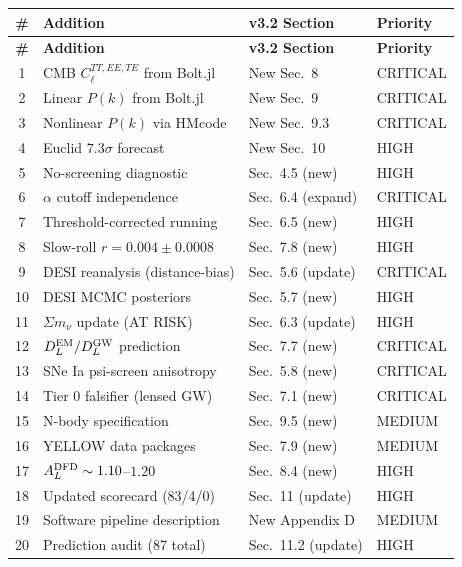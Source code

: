 \documentclass[11pt,a4paper]{article}
\begin{document}
\begin{center}
\begin{longtable}{clll}
\toprule
\textbf{\#} & \textbf{Addition} & \textbf{v3.2 Section} & \textbf{Priority} \\
\midrule
\endfirsthead
\toprule
\textbf{\#} & \textbf{Addition} & \textbf{v3.2 Section} & \textbf{Priority} \\
\midrule
\endhead
1 & CMB $C_\ell^{TT,EE,TE}$ from Bolt.jl & New Sec.\ 8 & CRITICAL \\
2 & Linear $P(k)$ from Bolt.jl & New Sec.\ 9 & CRITICAL \\
3 & Nonlinear $P(k)$ via HMcode & New Sec.\ 9.3 & CRITICAL \\
4 & Euclid $7.3\sigma$ forecast & New Sec.\ 10 & HIGH \\
5 & No-screening diagnostic & Sec.\ 4.5 (new) & HIGH \\
6 & $\alpha$ cutoff independence & Sec.\ 6.4 (expand) & CRITICAL \\
7 & Threshold-corrected running & Sec.\ 6.5 (new) & HIGH \\
8 & Slow-roll $r = 0.004 \pm 0.0008$ & Sec.\ 7.8 (new) & HIGH \\
9 & DESI reanalysis (distance-bias) & Sec.\ 5.6 (update) & CRITICAL \\
10 & DESI MCMC posteriors & Sec.\ 5.7 (new) & HIGH \\
11 & $\Sigma m_\nu$ update (AT RISK) & Sec.\ 6.3 (update) & HIGH \\
12 & $D_L^{\rm EM}/D_L^{\rm GW}$ prediction & Sec.\ 7.7 (new) & CRITICAL \\
13 & SNe Ia psi-screen anisotropy & Sec.\ 5.8 (new) & CRITICAL \\
14 & Tier 0 falsifier (lensed GW) & Sec.\ 7.1 (new) & CRITICAL \\
15 & N-body specification & Sec.\ 9.5 (new) & MEDIUM \\
16 & YELLOW data packages & Sec.\ 7.9 (new) & MEDIUM \\
17 & $A_L^{\rm DFD} \sim 1.10$--$1.20$ & Sec.\ 8.4 (new) & HIGH \\
18 & Updated scorecard (83/4/0) & Sec.\ 11 (update) & HIGH \\
19 & Software pipeline description & New Appendix D & MEDIUM \\
20 & Prediction audit (87 total) & Sec.\ 11.2 (update) & HIGH \\
\bottomrule
\end{longtable}
\end{center}
\end{document}
